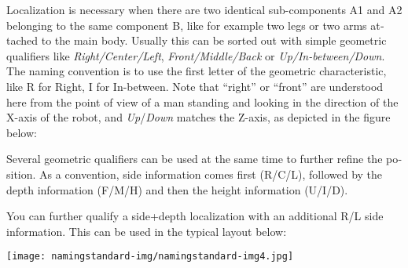 \documentclass[a4paper]{article}
\begin{document}
{
\foreignlanguage{english}{\textsf{Localization is necessary when there
are two identical sub-components A1 and A2 belonging to the same
component B, like for example two legs or two arms attached to the main
body. Usually this can be sorted out with simple geometric qualifiers
like
}}\foreignlanguage{english}{\textsf{\textit{Right/Center/Left}}}\foreignlanguage{english}{\textsf{,
}}\foreignlanguage{english}{\textsf{\textit{Front/Middle/Back}}}\foreignlanguage{english}{\textsf{
or
}}\foreignlanguage{english}{\textsf{\textit{Up}}}\foreignlanguage{english}{\textsf{\textit{/In-between/Down}}}\foreignlanguage{english}{\textsf{.
The naming convention is to use the first letter of the geometric
characteristic, like
}}\foreignlanguage{english}{R}\foreignlanguage{english}{\textsf{ for
Right, }}\foreignlanguage{english}{I}\foreignlanguage{english}{\textsf{
for In-between. Note that “right” or “front” are understood here from
the point of view of a man standing and looking in the direction of the
X-axis of the robot, and
}}\foreignlanguage{english}{\textsf{\textit{Up}}}\foreignlanguage{english}{\textsf{/}}\foreignlanguage{english}{\textsf{\textit{Down}}}\foreignlanguage{english}{\textsf{
matches the Z-axis, as depicted in the figure below:}}}

{\par}

{
\foreignlanguage{english}{\textsf{Several geometric qualifiers can be
used at the same time to further refine the position. As a convention,
side information comes first
(}}\foreignlanguage{english}{R}\foreignlanguage{english}{\textsf{/}}\foreignlanguage{english}{C}\foreignlanguage{english}{\textsf{/}}\foreignlanguage{english}{L}\foreignlanguage{english}{\textsf{),
followed by the depth information
(}}\foreignlanguage{english}{F}\foreignlanguage{english}{\textsf{/}}\foreignlanguage{english}{M}\foreignlanguage{english}{\textsf{/}}\foreignlanguage{english}{H}\foreignlanguage{english}{\textsf{)
and then the height information
(}}\foreignlanguage{english}{U}\foreignlanguage{english}{\textsf{/}}\foreignlanguage{english}{I}\foreignlanguage{english}{\textsf{/}}\foreignlanguage{english}{D}\foreignlanguage{english}{\textsf{).
}}}

{\sffamily
You can further qualify a side+depth localization with an additional R/L
side information. This can be used in the typical layout below:}

{\centering 
\texttt{[image: namingstandard-img/namingstandard-img4.jpg]}
\par}
\end{document}
